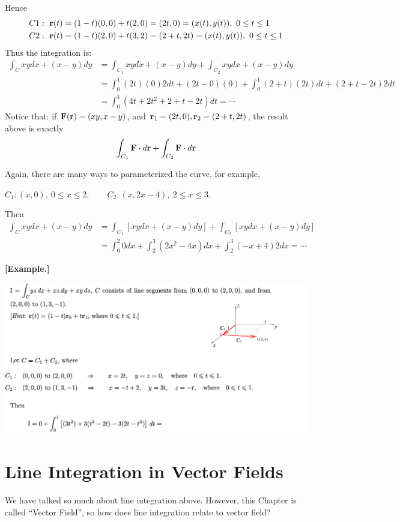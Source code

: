 \documentclass[11pt, a4paper]{MATH2023}
\newcommand{\eg}{\textbf{[Example.] }}
\newcommand{\rr}{{\bf r}}
\newcommand{\FF}{{\bf F}}
\begin{document}
\begin{spacing}{1.3}
    Hence 
    \begin{align*}
        C1: \ \rr(t) &= (1-t)(0, 0) + t(2, 0) = (2t, 0) = (x(t), y(t)),\ 0\le t\le 1\\
        C2: \ \rr(t) &= (1-t)(2, 0) + t(3, 2) = (2+t, 2t) = (x(t), y(t)),\ 0\le t\le 1
    \end{align*}
    Thus the integration is: 
    \begin{align*}
        \int_C xydx+(x-y)dy &= \int_{C_1} xydx+(x-y)dy + \int_{C_2} xydx+(x-y)dy\\
                    &= \int_0^1 (2t)(0) 2dt+(2t-0)(0) +\int_0^1 (2+t)(2t)dt + (2+t-2t) 2dt\\
                    &= \int_0^1 (4t+2t^2+2+t-2t) dt =\cdots
    \end{align*}
    {\blue Notice that: } if $\FF(\rr)=(xy, x-y)$, and $\rr_1=(2t, 0), \rr_2=(2+t,2t)$, 
    the result above is exactly 
    $$\int_{C_1} \FF\cdot d\rr + \int_{C_2} \FF\cdot d\rr$$

    {\blue Again, there are many ways to parameterized the curve, } for example,

    $C_{1}: (x, 0),\  0 \le x \le 2, \qquad C_{2}: (x, 2x-4),\  2 \le x \le 3 .$ 
    
    Then
    \begin{align*}
        \int_{C} x y d x+(x-y) d y 
        &=\int_{C_{1}}[x y d x+(x-y) d y]+\int_{C_{2}}[x y d x+(x-y) d y] \\
        &=\int_{0}^{2} 0 d x+\int_{2}^{3}\left(2 x^{2}-4 x\right) d x+\int_{2}^{3}(-x+4) 2 d x = \cdots
    \end{align*}

    \newpage
    \eg 
    \begin{center}
        \includegraphics[scale=0.52]{images/Ch15-wrt-eg2.png}
    \end{center}

    \newpage
    \section{Line Integration in Vector Fields}
    We have talked so much about line integration above. However, this Chapter is called ``Vector Field'',
    so how does line integration relate to vector field?

    

\end{spacing}
\end{document}
